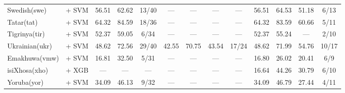 \begin{table*}[h]
{\begin{tabular}{l|c|ccc|cccc|cccc}
            Swedish(swe)                            & \citep{wang2024multilingual}     + SVM                                                       & 56.51                        & 62.62                        & 13/40                       & —             & —             & —                 & —             & 56.51         & 64.53         & 51.18             & 6/13          \\
            Tatar(tat)                              & \citep{wang2024multilingual}    + SVM                                                        & 64.32                        & 84.59                        & 18/36                       & —             & —             & —                 & —             & 64.32         & 83.59         & 60.66             & 5/11          \\
            Tigrinya(tir)                           & \citep{wang2024multilingual}    + SVM                                                        & 52.37                        & 59.05                        & 6/34                        & —             & —             & —                 & —             & 52.37         & 55.24         & —                 & 2/10          \\
            Ukrainian(ukr)                          & \citep{sturua2024jinaembeddingsv3multilingualembeddingstask}   + SVM                         & 48.62                        & 72.56                        & 29/40                       & 42.55         & 70.75         & 43.54             & 17/24         & 48.62         & 71.99         & 54.76             & 10/17         \\
            Emakhuwa(vmw)                           & \citep{sturua2024jinaembeddingsv3multilingualembeddingstask}   + SVM                         & 16.81                        & 32.50                        & 5/31                        & —             & —             & —                 & —             & 16.80         & 26.02         & 20.41             & 6/9           \\
            isiXhosa(xho)                           & \citep{wang2024multilingual}     + XGB                                                       & —                            & —                            & —                           & —             & —             & —                 & —             & 16.64         & 44.26         & 30.79             & 6/10          \\
            Yoruba(yor)                             & \citep{wang2024multilingual}     + SVM                                                       & 34.09                        & 46.13                        & 9/32                        & —             & —             & —                 & —             & 34.09         & 46.79         & 27.44             & 4/11          \\

\end{tabular}}
\end{table*}
